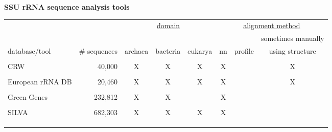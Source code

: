 \documentclass[landscape]{slides}
\begin{document}
\begin{slide}
\begin{center} 
\large
\textbf{SSU rRNA sequence analysis tools}
\end{center}
\medskip

\begin{center}
  \tiny
  \begin{tabular}{lr|ccc|ccc|} 
    & & \multicolumn{3}{|c|}{\underline{domain}} & \multicolumn{3}{|c|}{\underline{alignment method}} \\ 
    & & & & & & & sometimes manually \\
    database/tool & \# sequences & archaea & bacteria & eukarya & nn & profile & using structure \\ \hline
    & & & & & & & \\
    CRW & 40,000 & X & X & X & X & & X \\ 
    & & & & & & & \\
    European rRNA DB & 20,460 & X & X & X & X & & X \\ 
    & & & & & & & \\
    Green Genes & 232,812 & X & X & & X & & \\ 
    & & & & & & & \\
    SILVA & 682,303 & X & X & X & X &  & \\ %
    & & & & & & & \\
    & & & & & & & \\
    & & & & & & & \\
  \end{tabular}
\end{center}


\vfill
\end{slide}
\end{document}
